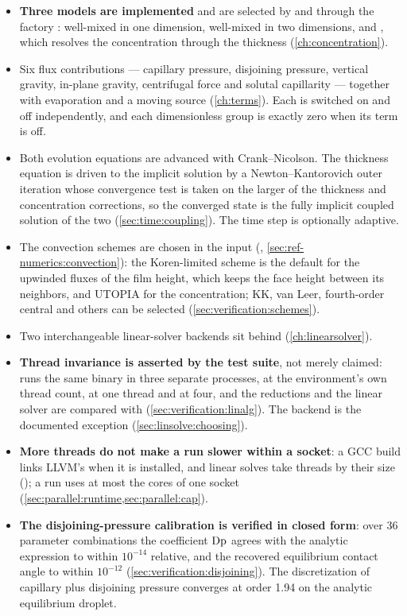 \begin{itemize}
  \item \textbf{Three models are implemented} and are selected by
     and  through the factory
    : well-mixed in one dimension, well-mixed in two
    dimensions, and , which resolves the concentration through the
    thickness (\cref{ch:concentration}).
  \item Six flux contributions --- capillary pressure, disjoining pressure,
    vertical gravity, in-plane gravity, centrifugal force and solutal
    capillarity --- together with evaporation and a moving source
    (\cref{ch:terms}). Each is switched on and off independently, and each
    dimensionless group is exactly zero when its term is off.
  \item Both evolution equations are advanced with Crank--Nicolson. The
    thickness equation is driven to the implicit solution by a
    Newton--Kantorovich outer iteration whose convergence test is taken on the
    larger of the thickness and concentration corrections, so the converged
    state is the fully implicit coupled solution of the two
    (\cref{sec:time:coupling}). The time step is optionally adaptive.
  \item The convection schemes are chosen in the input
    (, \cref{sec:ref-numerics:convection}): the
    Koren-limited scheme is the default for the upwinded fluxes of the film
    height, which keeps the face height between its neighbors, and UTOPIA
    for the concentration; KK, van Leer, fourth-order central and others can
    be selected (\cref{sec:verification:schemes}).
  \item Two interchangeable linear-solver backends sit behind
     (\cref{ch:linearsolver}).
  \item \textbf{Thread invariance is asserted by the test suite}, not merely
    claimed:  runs the same binary in three separate processes, at
    the environment's own thread count, at one thread and at four, and the
    reductions and the linear solver are compared with \code{==}
    (\cref{sec:verification:linalg}). The  backend is the
    documented exception (\cref{sec:linsolve:choosing}).
  \item \textbf{More threads do not make a run slower within a socket}: a GCC
    build links LLVM's  when it is installed, and linear solves
    take threads by their size (); a run uses at most the
    cores of one socket (\cref{sec:parallel:runtime,sec:parallel:cap}).
  \item \textbf{The disjoining-pressure calibration is verified in closed
    form}: over 36 parameter combinations the coefficient $\mathrm{Dp}$ agrees with
    the analytic expression to within $10^{-14}$ relative, and the recovered
    equilibrium contact angle to within $10^{-12}$
    (\cref{sec:verification:disjoining}). The discretization of capillary plus
    disjoining pressure converges at order 1.94 on the analytic equilibrium
    droplet.
\end{itemize}

